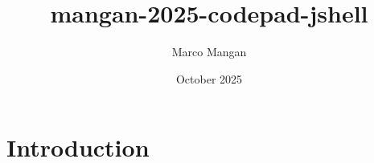 \documentclass{article}
\title{mangan-2025-codepad-jshell}
\author{Marco Mangan}
\date{October 2025}
\begin{document}
\maketitle

\section{Introduction}
\end{document}
